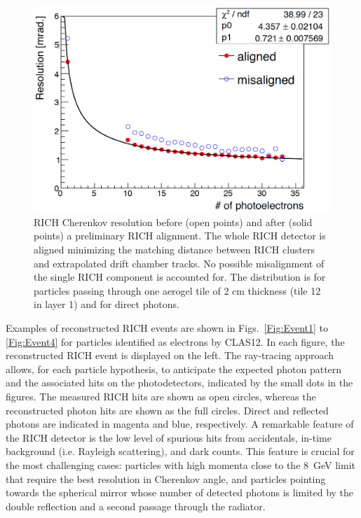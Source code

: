 \documentclass[5p,times,twocolumn]{elsarticle}
\begin{document}
\begin{figure}[t]
\begin{center}
\includegraphics[width=1.0\columnwidth]{Tile12_rms_plot2.png}
\end{center}
\caption{RICH Cherenkov resolution before (open points) and after (solid points) a preliminary RICH alignment. The whole RICH
  detector is aligned minimizing the matching distance between RICH clusters and extrapolated drift chamber tracks. No
  possible misalignment of the single RICH component is accounted for. The distribution is for particles passing through
  one aerogel tile of 2 cm thickness (tile 12 in layer 1) and for direct photons.}
\label{Fig:Align}
\end{figure}

Examples of reconstructed RICH events are shown in Figs.~\ref{Fig:Event1} to \ref{Fig:Event4} for particles
identified as electrons by CLAS12. In each figure, the reconstructed RICH event is displayed on the left. The
ray-tracing approach allows, for each particle hypothesis, to anticipate the expected photon pattern and the associated
hits on the photodetectors, indicated by the small dots in the figures.
The measured RICH hits are shown as open circles, whereas the reconstructed photon hits are shown as the full
circles. Direct and reflected photons are indicated in magenta and blue, respectively. A remarkable feature of the
RICH detector is the low level of spurious hits from accidentals, in-time background (i.e. Rayleigh scattering), and
dark counts. This feature is crucial for the most challenging cases: particles with high momenta close to the 8~GeV
limit that require the best resolution in Cherenkov angle, and particles pointing towards the spherical mirror whose
number of detected photons is limited by the double reflection and a second passage through the radiator. 
\end{document}
